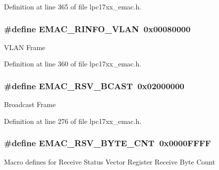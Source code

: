 \-Definition at line 365 of file lpc17xx\-\_\-emac.\-h.

\hypertarget{group___e_m_a_c___private___macros_ga56550639a7947838118c65fd0faa5c07}{
\subsubsection[{\-E\-M\-A\-C\-\_\-\-R\-I\-N\-F\-O\-\_\-\-V\-L\-A\-N}]{\setlength{\rightskip}{0pt plus 5cm}\#define {\bf \-E\-M\-A\-C\-\_\-\-R\-I\-N\-F\-O\-\_\-\-V\-L\-A\-N}~0x00080000}}\label{group___e_m_a_c___private___macros_ga56550639a7947838118c65fd0faa5c07}
\-V\-L\-A\-N \-Frame 

\-Definition at line 360 of file lpc17xx\-\_\-emac.\-h.

\hypertarget{group___e_m_a_c___private___macros_ga1154e5eca8a1a7b098b45a43b80e5449}{
\subsubsection[{\-E\-M\-A\-C\-\_\-\-R\-S\-V\-\_\-\-B\-C\-A\-S\-T}]{\setlength{\rightskip}{0pt plus 5cm}\#define {\bf \-E\-M\-A\-C\-\_\-\-R\-S\-V\-\_\-\-B\-C\-A\-S\-T}~0x02000000}}\label{group___e_m_a_c___private___macros_ga1154e5eca8a1a7b098b45a43b80e5449}
\-Broadcast \-Frame 

\-Definition at line 276 of file lpc17xx\-\_\-emac.\-h.

\hypertarget{group___e_m_a_c___private___macros_ga9f84a9441653d7d72c1479e44d056e1f}{
\subsubsection[{\-E\-M\-A\-C\-\_\-\-R\-S\-V\-\_\-\-B\-Y\-T\-E\-\_\-\-C\-N\-T}]{\setlength{\rightskip}{0pt plus 5cm}\#define {\bf \-E\-M\-A\-C\-\_\-\-R\-S\-V\-\_\-\-B\-Y\-T\-E\-\_\-\-C\-N\-T}~0x0000\-F\-F\-F\-F}}\label{group___e_m_a_c___private___macros_ga9f84a9441653d7d72c1479e44d056e1f}
\-Macro defines for \-Receive \-Status \-Vector \-Register \-Receive \-Byte \-Count 

